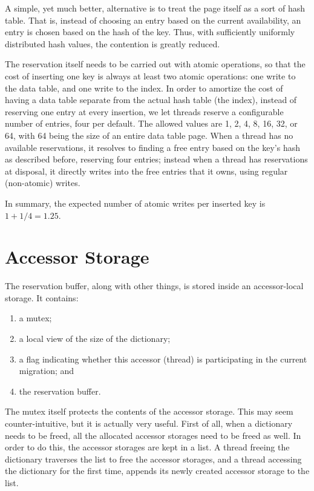 A simple, yet much better, alternative is to treat the page itself as a sort of hash table.
That is, instead of choosing an entry based on the current availability, an entry is chosen based on the hash of the key.
Thus, with sufficiently uniformly distributed hash values, the contention is greatly reduced.

The reservation itself needs to be carried out with atomic operations, so that the cost of inserting one key is always at least two atomic operations: one write to the data table, and one write to the index.
In order to amortize the cost of having a data table separate from the actual hash table (the index), instead of reserving one entry at every insertion, we let threads reserve a configurable number of entries, four per default.
The allowed values are 1, 2, 4, 8, 16, 32, or 64, with 64 being the size of an entire data table page.
When a thread has no available reservations, it resolves to finding a free entry based on the key's hash as described before, reserving four entries; instead when a thread has reservations at disposal, it directly writes into the free entries that it owns, using regular (non-atomic) writes.

In summary, the expected number of atomic writes per inserted key is $1 + 1/4 = 1.25$.


\section{Accessor Storage}\label{sec:accessor-storage}

The reservation buffer, along with other things, is stored inside an accessor-local storage.
It contains:
\begin{enumerate}
    \item a mutex;
    \item a local view of the size of the dictionary;
    \item a flag indicating whether this accessor (thread) is participating in the current migration; and
    \item the reservation buffer.
\end{enumerate}

The mutex itself protects the contents of the accessor storage.
This may seem counter-intuitive, but it is actually very useful.
First of all, when a dictionary needs to be freed, all the allocated accessor storages need to be freed as well.
In order to do this, the accessor storages are kept in a list.
A thread freeing the dictionary traverses the list to free the accessor storages, and a thread accessing the dictionary for the first time, appends its newly created accessor storage to the list.


